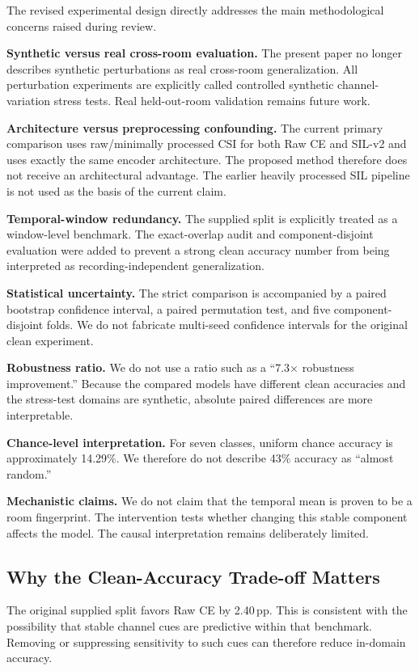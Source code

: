 \documentclass[runningheads]{llncs}
\newcommand{\method}{SIL-v2}
\newcommand{\pp}{\ensuremath{\,\mathrm{pp}}}
\begin{document}
The revised experimental design directly addresses the main methodological concerns raised during review.

\textbf{Synthetic versus real cross-room evaluation.}
The present paper no longer describes synthetic perturbations as real cross-room generalization. All perturbation experiments are explicitly called controlled synthetic channel-variation stress tests. Real held-out-room validation remains future work.

\textbf{Architecture versus preprocessing confounding.}
The current primary comparison uses raw/minimally processed CSI for both Raw CE and \method{} and uses exactly the same encoder architecture. The proposed method therefore does not receive an architectural advantage. The earlier heavily processed SIL pipeline is not used as the basis of the current claim.

\textbf{Temporal-window redundancy.}
The supplied split is explicitly treated as a window-level benchmark. The exact-overlap audit and component-disjoint evaluation were added to prevent a strong clean accuracy number from being interpreted as recording-independent generalization.

\textbf{Statistical uncertainty.}
The strict comparison is accompanied by a paired bootstrap confidence interval, a paired permutation test, and five component-disjoint folds. We do not fabricate multi-seed confidence intervals for the original clean experiment.

\textbf{Robustness ratio.}
We do not use a ratio such as a ``7.3$\times$ robustness improvement.'' Because the compared models have different clean accuracies and the stress-test domains are synthetic, absolute paired differences are more interpretable.

\textbf{Chance-level interpretation.}
For seven classes, uniform chance accuracy is approximately 14.29\%. We therefore do not describe 43\% accuracy as ``almost random.''

\textbf{Mechanistic claims.}
We do not claim that the temporal mean is proven to be a room fingerprint. The intervention tests whether changing this stable component affects the model. The causal interpretation remains deliberately limited.

\subsection{Why the Clean-Accuracy Trade-off Matters}

The original supplied split favors Raw CE by 2.40\pp. This is consistent with the possibility that stable channel cues are predictive within that benchmark. Removing or suppressing sensitivity to such cues can therefore reduce in-domain accuracy.
\end{document}
